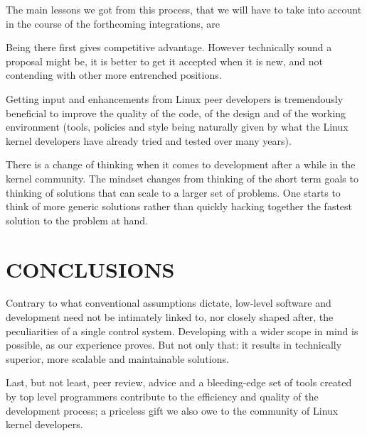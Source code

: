 \documentclass{JAC2003}
\begin{document}
The main lessons we got from this process, that we will have to take into
account in the course of the forthcoming integrations, are
\begin{Itemize}
\item Being there first gives competitive advantage. However technically
    sound a proposal might be, it is better to get it accepted when it is new,
    and not contending with other more entrenched positions.
\item Getting input and enhancements from Linux peer developers
    is tremendously beneficial to improve the quality of the code, of the
    design and of the working environment (tools, policies and style being
    naturally given by what the Linux kernel developers have already tried
    and tested over many years).
\item
    There is a change of thinking when it comes to development after a while
    in the kernel community. The mindset changes from thinking of the short
    term goals to thinking of solutions that can scale to a larger set of
    problems. One starts to think of more generic solutions rather than
    quickly hacking together the fastest solution to the problem at hand.
\end{Itemize}

\section{CONCLUSIONS}

Contrary to what conventional assumptions dictate, low-level software
and development need not be intimately linked to, nor closely shaped
after, the peculiarities of a single control system. Developing with a
wider scope in mind is possible, as our experience proves. But not only
that: it results in technically superior, more scalable and maintainable
solutions.

Last, but not least, peer review, advice and a bleeding-edge set of tools
created by top level programmers contribute to the efficiency and quality
of the development process; a priceless gift we also owe to the
community of Linux kernel developers.
\end{document}
